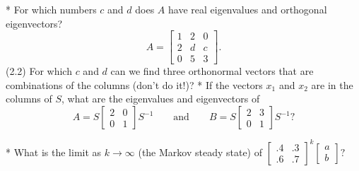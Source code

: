 * For which numbers \(c\) and \(d\) does \(A\) have real eigenvalues and orthogonal eigenvectors? \[A=\begin{bmatrix}1&2&0\\ 2&d&c\\ 0&5&3\end{bmatrix}.\] (2.2) For which \(c\) and \(d\) can we find three orthonormal vectors that are combinations of the columns (don't do it!)?
* If the vectors \(x_{1}\) and \(x_{2}\) are in the columns of \(S\), what are the eigenvalues and eigenvectors of \[A=S\begin{bmatrix}2&0\\ 0&1\end{bmatrix}S^{-1}\qquad\text{and}\qquad B=S\begin{bmatrix}2&3\\ 0&1\end{bmatrix}S^{-1}?\]

* What is the limit as \(k\to\infty\) (the Markov steady state) of \(\begin{bmatrix}.4&.3\\ .6&.7\end{bmatrix}^{k}\begin{bmatrix}a\\ b\end{bmatrix}?\) 